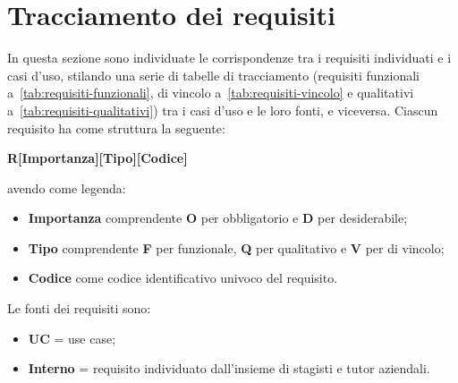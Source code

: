 \section{Tracciamento dei requisiti}\label{sec:tracciamento-requisiti}

In questa sezione sono individuate le corrispondenze tra i requisiti individuati e i casi d'uso, stilando una serie di tabelle di tracciamento 
(requisiti funzionali a~\ref{tab:requisiti-funzionali}, di vincolo a~\ref{tab:requisiti-vincolo} e qualitativi a~\ref{tab:requisiti-qualitativi}) tra i casi d'uso e le loro fonti, e viceversa.
Ciascun requisito ha come struttura la seguente:
\begin{center}
  \textbf{R[Importanza][Tipo][Codice]}
\end{center}
avendo come legenda:
\begin{itemize}
\item \textbf{Importanza} comprendente \textbf{O} per obbligatorio e \textbf{D} per desiderabile;
\item \textbf{Tipo} comprendente \textbf{F} per funzionale, \textbf{Q} per qualitativo e \textbf{V} per di vincolo;
\item \textbf{Codice} come codice identificativo univoco del requisito.
\end{itemize}
Le fonti dei requisiti sono:
\begin{itemize}
  \item \textbf{UC} = use case;
  \item \textbf{Interno} = requisito individuato dall'insieme di stagisti e tutor aziendali.
\end{itemize}


\renewcommand{\arraystretch}{1.1}

